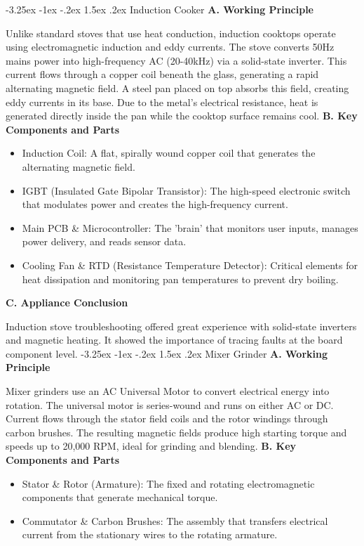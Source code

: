 \documentclass[11pt,a4paper]{report}
\makeatletter
\renewcommand{\section}{\@startsection{section}{1}{\z@}%
  {-3.25ex \@plus -1ex \@minus -.2ex}%
  {1.5ex \@plus.2ex}%
  {\normalfont\Large\bfseries\color{primaryColor}}}
\makeatother
\begin{document}
\section{Induction Cooker}
\noindent\textbf{A. Working Principle}\par\medskip
Unlike standard stoves that use heat conduction, induction cooktops operate using electromagnetic induction and eddy currents. The stove converts 50Hz mains power into high-frequency AC (20-40kHz) via a solid-state inverter. This current flows through a copper coil beneath the glass, generating a rapid alternating magnetic field. A steel pan placed on top absorbs this field, creating eddy currents in its base. Due to the metal's electrical resistance, heat is generated directly inside the pan while the cooktop surface remains cool.
\noindent\textbf{B. Key Components and Parts}\par\medskip
\begin{itemize}
  \item Induction Coil: A flat, spirally wound copper coil that generates the alternating magnetic field.
  \item IGBT (Insulated Gate Bipolar Transistor): The high-speed electronic switch that modulates power and creates the high-frequency current.
  \item Main PCB \& Microcontroller: The 'brain' that monitors user inputs, manages power delivery, and reads sensor data.
  \item Cooling Fan \& RTD (Resistance Temperature Detector): Critical elements for heat dissipation and monitoring pan temperatures to prevent dry boiling.
\end{itemize}
\noindent\textbf{C. Appliance Conclusion}\par\medskip
Induction stove troubleshooting offered great experience with solid-state inverters and magnetic heating. It showed the importance of tracing faults at the board component level.
\section{Mixer Grinder}
\noindent\textbf{A. Working Principle}\par\medskip
Mixer grinders use an AC Universal Motor to convert electrical energy into rotation. The universal motor is series-wound and runs on either AC or DC. Current flows through the stator field coils and the rotor windings through carbon brushes. The resulting magnetic fields produce high starting torque and speeds up to 20,000 RPM, ideal for grinding and blending.
\noindent\textbf{B. Key Components and Parts}\par\medskip
\begin{itemize}
  \item Stator \& Rotor (Armature): The fixed and rotating electromagnetic components that generate mechanical torque.
  \item Commutator \& Carbon Brushes: The assembly that transfers electrical current from the stationary wires to the rotating armature.
\end{itemize}
\end{document}
